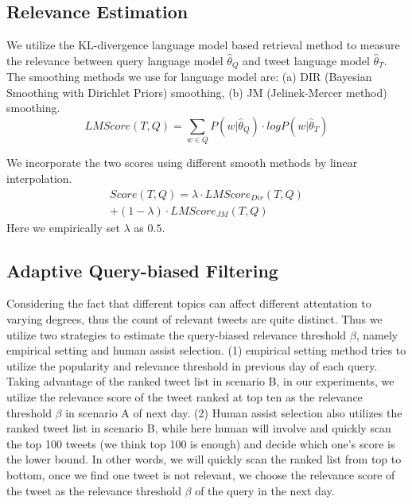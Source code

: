 \subsection{Relevance Estimation}
We utilize the KL-divergence language model based retrieval method to measure the relevance between query language model $\widehat{\theta}_Q$ and tweet language model $\widehat{\theta}_T$. The smoothing methods we use for language model are: (a) DIR (Bayesian Smoothing with Dirichlet Priors) smoothing, (b) JM (Jelinek-Mercer method) smoothing.
\begin{equation}
\label{equ:lm}
LMScore(T,Q) = \sum_{w \in Q} P(w|\widehat{\theta}_Q) \cdot logP(w|\widehat{\theta}_T)
\end{equation}

We incorporate the two scores using different smooth methods by linear interpolation.
\begin{equation}
\begin{aligned}
\label{equ:merge}
Score(T,Q) = \lambda \cdot LMScore_{Dir}(T,Q) \\+ (1-\lambda) \cdot LMScore_{JM}(T,Q)
\end{aligned}
\end{equation}
Here we empirically set $\lambda$ as $0.5$.
\subsection{Adaptive Query-biased Filtering}
Considering the fact that different topics can affect different attentation to varying degrees,
thus the count of relevant tweets are quite distinct.
Thus we utilize two strategies to estimate the query-biased relevance threshold $\beta$, namely empirical setting and human assist selection. 
(1) empirical setting method tries to utilize the popularity and relevance threshold in previous day of each query. Taking advantage of the ranked tweet list in scenario B, in our experiments, we utilize the relevance score of the tweet ranked at top ten as the relevance threshold $\beta$ in scenario A of next day. 
(2) Human assist selection also utilizes the ranked tweet list in scenario B, while here human will involve and quickly scan the top 100 tweets (we think top 100 is enough) and decide which one's score is the lower bound. In other words, we will quickly scan the ranked list from top to bottom, once we find one tweet is not relevant, we choose the relevance score of the tweet as the relevance threshold $\beta$ of the query in the next day.

